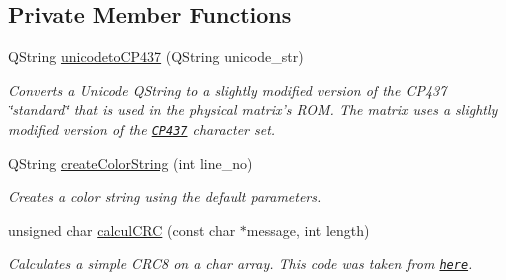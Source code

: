 \subsection*{Private Member Functions}
\begin{DoxyCompactItemize}
\item 
Q\+String \hyperlink{class_matrice_rgb_a53a4ee970396d25468dd263d4bede177}{unicodeto\+C\+P437} (Q\+String unicode\+\_\+str)
\begin{DoxyCompactList}\small\item\em Converts a Unicode Q\+String to a slightly modified version of the C\+P437 \char`\"{}standard\char`\"{} that is used in the physical matrix's R\+O\+M. The matrix uses a slightly modified version of the \href{http://en.wikipedia.org/wiki/Cp437}{\tt C\+P437} character set. \end{DoxyCompactList}\item 
Q\+String \hyperlink{class_matrice_rgb_a05ea8eaf536cc656dfe993710221aa30}{create\+Color\+String} (int line\+\_\+no)
\begin{DoxyCompactList}\small\item\em Creates a color string using the default parameters. \end{DoxyCompactList}\item 
unsigned char \hyperlink{class_matrice_rgb_ab3067fe6615c058957d51f345ab2dba6}{calcul\+C\+R\+C} (const char $\ast$message, int length)
\begin{DoxyCompactList}\small\item\em Calculates a simple C\+R\+C8 on a char array. This code was taken from \href{http://www.leonardomiliani.com/en/2013/un-semplice-crc8-per-arduino/}{\tt here}. \end{DoxyCompactList}\end{DoxyCompactItemize}
